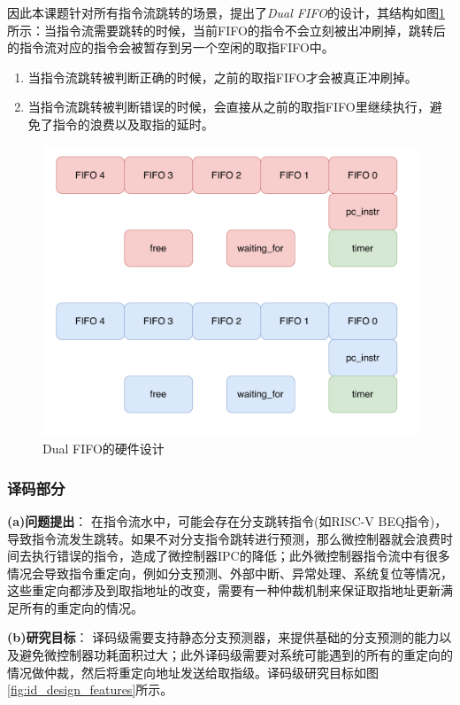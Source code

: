 \documentclass[a4paper, 12pt]{article}
\begin{document}
\begin{itemize}
    因此本课题针对所有指令流跳转的场景，提出了\textit{Dual FIFO}的设计，其结构如图\ref{fig:if_dual_fifo}所示：当指令流需要跳转的时候，当前FIFO的指令不会立刻被出冲刷掉，跳转后的指令流对应的指令会被暂存到另一个空闲的取指FIFO中。
    \begin{enumerate}
      \item 当指令流跳转被判断正确的时候，之前的取指FIFO才会被真正冲刷掉。
      \item 当指令流跳转被判断错误的时候，会直接从之前的取指FIFO里继续执行，避免了指令的浪费以及取指的延时。
    \end{enumerate}
  
\end{itemize}

\begin{figure}[htbp]
  \centering
  \includegraphics[width=0.6\linewidth]{./images/if_dual_fifo.pdf}
  \caption{Dual FIFO的硬件设计}
  \label{fig:if_dual_fifo}
\end{figure}

\subsubsection{译码部分}
\textbf{(a)问题提出}：
在指令流水中，可能会存在分支跳转指令(如RISC-V BEQ指令)，导致指令流发生跳转。如果不对分支指令跳转进行预测，那么微控制器就会浪费时间去执行错误的指令，造成了微控制器IPC的降低；此外微控制器指令流中有很多情况会导致指令重定向，例如分支预测、外部中断、异常处理、系统复位等情况，这些重定向都涉及到取指地址的改变，需要有一种仲裁机制来保证取指地址更新满足所有的重定向的情况。

\textbf{(b)研究目标}：
译码级需要支持静态分支预测器，来提供基础的分支预测的能力以及避免微控制器功耗面积过大；此外译码级需要对系统可能遇到的所有的重定向的情况做仲裁，然后将重定向地址发送给取指级。译码级研究目标如图\ref{fig:id_design_features}所示。
\end{document}
